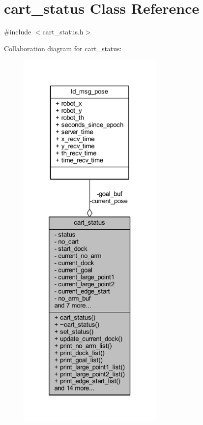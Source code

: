 \hypertarget{classcart__status}{}\section{cart\+\_\+status Class Reference}
\label{classcart__status}


{\ttfamily \#include $<$cart\+\_\+status.\+h$>$}



Collaboration diagram for cart\+\_\+status\+:\nopagebreak
\begin{figure}[H]
\begin{center}
\leavevmode
\includegraphics[height=550pt]{classcart__status__coll__graph}
\end{center}
\end{figure}
